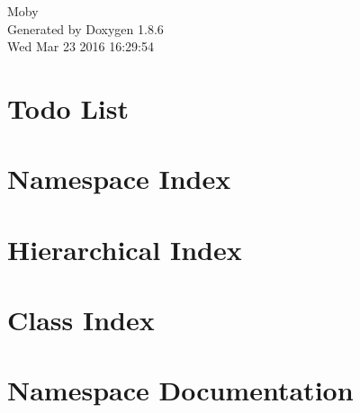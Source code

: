 \documentclass[twoside]{book}
\newcommand{\clearemptydoublepage}{%
  \newpage{\pagestyle{empty}\cleardoublepage}%
}
\begin{document}
\begin{titlepage}
\vspace*{7cm}
\begin{center}%
{\Large Moby }\\
\vspace*{1cm}
{\large Generated by Doxygen 1.8.6}\\
\vspace*{0.5cm}
{\small Wed Mar 23 2016 16:29:54}\\
\end{center}
\end{titlepage}
\clearemptydoublepage
\tableofcontents
\clearemptydoublepage
{}

\chapter{Todo List}
\label{todo}

\chapter{Namespace Index}

\chapter{Hierarchical Index}

\chapter{Class Index}

\chapter{Namespace Documentation}

\end{document}
